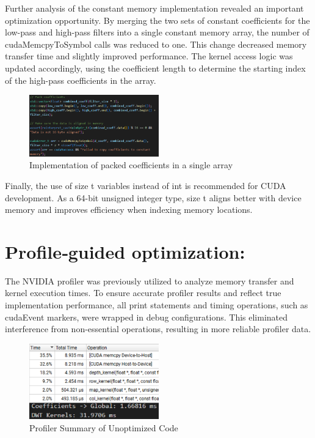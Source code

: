 \documentclass[journal,11pt]{IEEEtran}
\begin{document}
Further analysis of the constant memory implementation revealed an important optimization opportunity. By merging the two sets of constant coefficients for the low-pass and high-pass filters into a single constant memory array, the number of cudaMemcpyToSymbol calls was reduced to one. This change decreased memory transfer time and slightly improved performance. The kernel access logic was updated accordingly, using the coefficient length to determine the starting index of the high-pass coefficients in the array.

\begin{figure}[h]
\centering
\includegraphics[width=0.5\textwidth]{assets/packed-coeffs.png}
\caption{Implementation of packed coefficients in a single array}
\label{fig:10}
\end{figure}

Finally, the use of size t variables instead of int is recommended for CUDA development. As a 64-bit unsigned integer type, size t aligns better with device memory and improves efficiency when indexing memory locations.

\section{Profile‐guided optimization:}
The NVIDIA profiler was previously utilized to analyze memory transfer and kernel execution times. To ensure accurate profiler results and reflect true implementation performance, all print statements and timing operations, such as cudaEvent markers, were wrapped in debug configurations. This eliminated interference from non-essential operations, resulting in more reliable profiler data.

\begin{figure}[h]
    \centering
    \includegraphics[width=0.5\textwidth]{assets/unoptim-sum.png}
    \caption{Profiler Summary of Unoptimized Code}
    \label{fig:11}
\end{figure}
\end{document}
